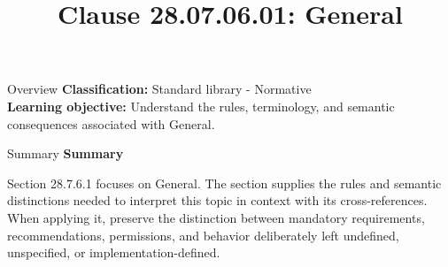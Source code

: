 \documentclass[10pt,letterpaper]{article}
\title{Clause 28.07.06.01: General}
\author{}
\date{}
\begin{document}
\maketitle
\begin{CornellOverviewBox}{Overview}
\textbf{Classification:} Standard library - Normative\\[2pt]
\textbf{Learning objective:} Understand the rules, terminology, and semantic consequences associated with General.
\end{CornellOverviewBox}\begin{CornellSummaryBox}{Summary}
{\sffamily\bfseries\color{Accent} Summary}\par\vspace{3pt}Section 28.7.6.1 focuses on General. The section supplies the rules and semantic distinctions needed to interpret this topic in context with its cross-references. When applying it, preserve the distinction between mandatory requirements, recommendations, permissions, and behavior deliberately left undefined, unspecified, or implementation-defined.
\end{CornellSummaryBox}
\end{document}
